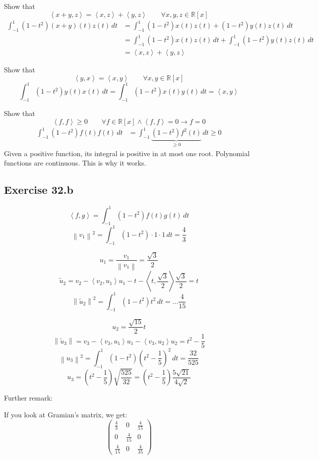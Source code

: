 \documentclass[a4paper]{article}
\theoremstyle{definition}
\newcommand\fun[1]{\left\langle{#1}\right\rangle}
\newcommand\norm[1]{\left\|{#1}\right\|}
\begin{document}
Show that
\[ \fun{x+y, z} = \fun{x,z} + \fun{y,z} \qquad \forall x,y,z \in \mathbb R[x] \]
\begin{align*}
  \int_{-1}^1 (1 - t^2) (x + y)(t) z(t) \, dt
    &= \int_{-1}^1 (1 - t^2) x(t) z(t) + (1 - t^2) y(t) z(t) \, dt \\
    &= \int_{-1}^1 (1 - t^2) x(t) z(t) \, dt + \int_{-1}^1 (1 - t^2) y(t) z(t) \, dt \\
    &= \fun{x,z} + \fun{y,z}
\end{align*}

Show that
\[ \fun{y,x} = \fun{x,y} \qquad \forall x,y \in \mathbb R[x] \]
\[ \int_{-1}^1 (1 - t^2) y(t) x(t) \, dt = \int_{-1}^1 (1 - t^2) x(t) y(t) \, dt = \fun{x,y} \]

Show that
\[ \fun{f,f} \geq 0 \qquad \forall f \in \mathbb R[x] \land \fun{f,f} = 0 \to f = 0 \]
\begin{align*}
  \int_{-1}^1 (1 - t^2) f(t) f(t) \, dt
    &= \int_{-1}^1 \underbrace{(1 - t^2) f^2(t)}_{\geq 0} \, dt \geq 0
\end{align*}
Given a positive function, its integral is positive in at most one root.
Polynomial functions are continuous. This is why it works.

\subsection{Exercise 32.b}
\[ \fun{f,g} = \int_{-1}^1 (1 - t^2) f(t) g(t) \, dt \]
\[ \norm{v_1}^2 = \int_{-1}^1 (1 - t^2) \cdot 1 \cdot 1 \, dt = \frac43 \]

\[ u_1 = \frac{v_1}{\norm{v_1}} = \frac{\sqrt{3}}{2} \]
\[ \tilde{u}_2 = v_2 - \fun{v_2, u_1} u_1 - t - \fun{t,\frac{\sqrt{3}}{2}} \frac{\sqrt{3}}{2} = t \]
\[ \norm{\tilde{u}_2}^2 = \int_{-1}^1 (1 - t^2) t^2 \, dt = \ldots \frac{4}{15} \]

\[ u_2 = \frac{\sqrt{15}}{2} t \]
\[ \norm{\tilde{u}_3} = v_3 - \fun{v_3, u_1} u_1 - \fun{v_3, u_2} u_2 = t^2 - \frac1{5} \]
\[ \norm{u_3}^2 = \int_{-1}^1 (1 - t^2) (t^2 - \frac15)^2 \, dt = \frac{32}{525} \]
\[ u_3 = (t^2 - \frac15) \sqrt{\frac{525}{32}} = (t^2 - \frac15) \frac{5 \sqrt{21}}{4 \sqrt{2}} \]

Further remark:

If you look at Gramian's matrix, we get:
\[
  \begin{pmatrix}
      \frac43 & 0 & \frac4{15} \\
      0 & \frac{4}{15} & 0 \\
      \frac4{15} & 0 & \frac{4}{35}
  \end{pmatrix}
\]
\end{document}
